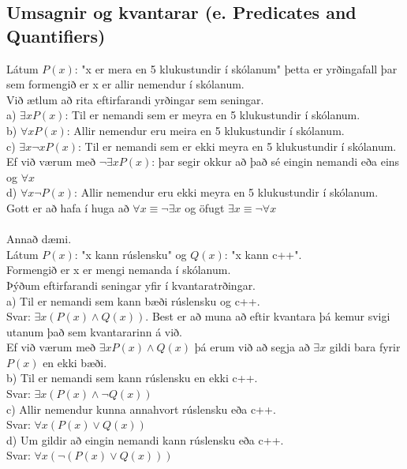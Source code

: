 \subsection{Umsagnir og kvantarar (e. Predicates and Quantifiers)}
Látum $P(x)$: "x er mera en 5 klukustundir í skólanum" þetta er yrðingafall þar sem formengið er x er allir nemendur í skólanum.\\
Við ætlum að rita eftirfarandi yrðingar sem seningar.\\
\indent a) $\exists x P(x)$: Til er nemandi sem er meyra en 5 klukustundir í skólanum.\\
\indent b) $\forall x P(x)$: Allir nemendur eru meira en 5 klukustundir í skólanum.\\
\indent c) $\exists x \lnot x P(x)$: Til er nemandi sem er ekki meyra en 5 klukustundir í skólanum.\\
\indent \indent  Ef við værum með $\lnot \exists x P(x)$: þar segir okkur að það sé eingin nemandi eða \indent \indent eins og $\forall x$\\
\indent d) $\forall x \lnot P(x)$: Allir nemendur eru ekki meyra en 5 klukustundir í skólanum.\\
Gott er að hafa í huga að $\forall x \equiv \lnot \exists x$ og öfugt $\exists x \equiv \lnot \forall x$\\ 
\\
Annað dæmi.\\
Látum $P(x)$: "x kann rúslensku" og $Q(x)$: "x kann c++".\\
Formengið er x er mengi nemanda í skólanum.\\
Þýðum eftirfarandi seningar yfir í kvantaratrðingar.\\
\indent a) Til er nemandi sem kann bæði rúslensku og c++.\\
\indent\indent Svar: $\exists x (P(x) \wedge Q(x))$. Best er að muna að eftir kvantara þá kemur svigi \indent \indent utanum það sem kvantararinn á við.\\ 
\indent \indent Ef við værum með $\exists x P(x) \wedge Q(x)$ þá erum við að segja að $\exists x$ gildi bara fyrir \indent \indent $P(x)$ en ekki bæði.\\
\indent b) Til er nemandi sem kann rúslensku en ekki c++.\\
\indent \indent Svar: $\exists x (P(x) \wedge \lnot Q(x))$\\
\indent c) Allir nemendur kunna annahvort rúslensku eða c++.\\
\indent \indent Svar: $\forall x (P(x) \vee Q(x))$\\
\indent d) Um gildir að eingin nemandi kann rúslensku eða c++.\\
\indent \indent Svar: $\forall x (\lnot(P(x) \vee Q(x)))$\\
\newpage

